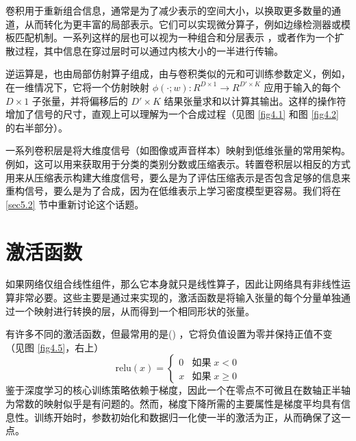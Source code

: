卷积用于重新组合信息，通常是为了减少表示的空间大小，以换取更多数量的通道，从而转化为更丰富的局部表示。它们可以实现微分算子，例如边缘检测器或模板匹配机制。一系列这样的层也可以视为一种组合和分层表示 \citep{arxiv-1311.2901}，或者作为一个扩散过程，其中信息在穿过层时可以通过内核大小的一半进行传输。

逆运算是，也由局部仿射算子组成，由与卷积类似的元和可训练参数定义，例如，在一维情况下，它将一个仿射映射 $\phi(\cdot;w):R^{D \times 1} \to R^{D' \times K}$ 应用于输入的每个 $D \times 1$ 子张量，并将偏移后的 $D' \times K$ 结果张量求和以计算其输出。这样的操作符增加了信号的尺寸，直观上可以理解为一个合成过程（见图 \ref{fig4.1} 和图 \ref{fig4.2} 的右半部分）。

一系列卷积层是将大维度信号（如图像或声音样本）映射到低维张量的常用架构。例如，这可以用来获取用于分类的类别分数或压缩表示。转置卷积层以相反的方式用来从压缩表示构建大维度信号，要么是为了评估压缩表示是否包含足够的信息来重构信号，要么是为了合成，因为在低维表示上学习密度模型更容易。我们将在 \ref{sec5.2} 节中重新讨论这个话题。

\section{激活函数}\label{sec4.3}

如果网络仅组合线性组件，那么它本身就只是线性算子，因此让网络具有非线性运算非常必要。这些主要是通过来实现的，激活函数是将输入张量的每个分量单独通过一个映射进行转换的层，从而得到一个相同形状的张量。

有许多不同的激活函数，但最常用的是() \citep{glorot11a}，它将负值设置为零并保持正值不变（见图 \ref{fig4.5}，右上）
$$
\text{relu}(x) = \begin{cases}
    0 &\text{如果}\; x < 0 \\
    x &\text{如果}\; x \ge 0
 \end{cases}
 $$
 鉴于深度学习的核心训练策略依赖于梯度，因此一个在零点不可微且在数轴正半轴为常数的映射似乎是有问题的。然而，梯度下降所需的主要属性是梯度平均具有信息性。训练开始时，参数初始化和数据归一化使一半的激活为正，从而确保了这一点。

